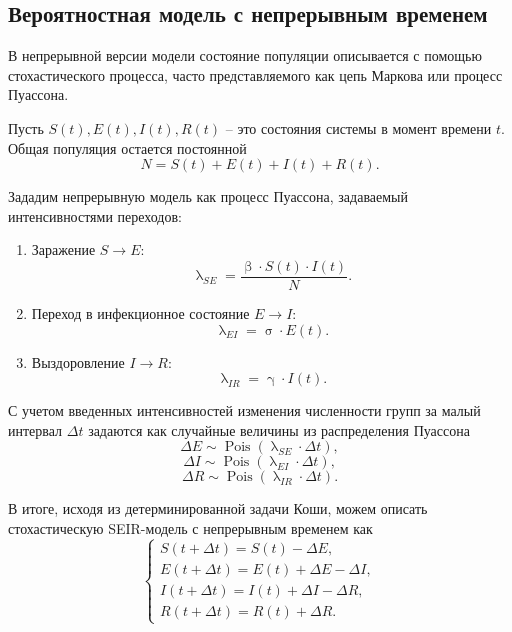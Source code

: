 \documentclass[a4paper, 14pt]{extreport}
\renewcommand{\beta}{\upbeta}
\renewcommand{\gamma}{\upgamma}
\renewcommand{\sigma}{\upsigma}
\renewcommand{\lambda}{\uplambda}
\newcommand{\Pois}{\operatorname{Pois}}
\begin{document}
	\subsection{Вероятностная модель с непрерывным временем}
	В непрерывной версии модели состояние популяции описывается с помощью стохастического процесса, часто представляемого как цепь Маркова или процесс Пуассона.
	
	Пусть $S(t), E(t), I(t), R(t)$ -- это состояния системы в момент времени $t$. Общая популяция остается постоянной
	$$N = S(t) + E(t) + I(t) + R(t).$$
	
	Зададим непрерывную модель как процесс Пуассона, задаваемый интенсивностями переходов:
	\begin{enumerate}
		\item Заражение $S \to E$:
		$$\lambda_{SE} = \dfrac{\beta \cdot S(t) \cdot I(t)}{N}.$$
		\item Переход в инфекционное состояние $E \to I$:
		$$\lambda_{EI} = \sigma \cdot E(t).$$
		\item Выздоровление $I \to R$:
		$$\lambda _{IR} = \gamma \cdot I(t).$$
	\end{enumerate}
	
	С учетом введенных интенсивностей изменения численности групп за малый интервал $\Delta t$ задаются как случайные величины из распределения Пуассона
	$$\Delta E \sim \Pois(\lambda_{SE} \cdot \Delta t),$$
	$$\Delta I \sim \Pois(\lambda_{EI} \cdot \Delta t),$$
	$$\Delta R \sim \Pois(\lambda_{IR} \cdot \Delta t).$$
	
	В итоге, исходя из детерминированной задачи Коши, можем описать стохастическую SEIR-модель с непрерывным временем как
	\begin{equation}
		\begin{cases}
			S(t+\Delta t) = S(t) - \Delta E,\\
			E(t+\Delta t) = E(t) + \Delta E - \Delta I,\\
			I(t + \Delta t) = I(t) + \Delta I - \Delta R,\\
			R(t + \Delta t) = R(t) + \Delta R.
		\end{cases}
	\end{equation}
	\newpage
\end{document}
